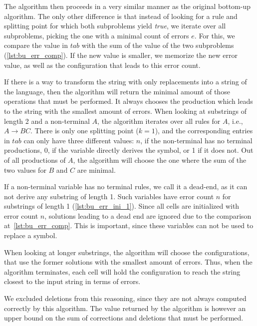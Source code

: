 The algorithm then proceeds in a very similar manner as the original bottom-up algorithm.
The only other difference is that instead of looking for a rule and splitting point for which both subproblems yield \textit{true}, we iterate over all subproblems, picking the one with a minimal count of errors $e$.
For this, we compare the value in $tab$ with the sum of the value of the two subproblems (\cref{lst:bu_err_comp}).
If the new value is smaller, we memorize the new error value, as well as the configuration that leads to this error count.

If there is a way to transform the string with only replacements into a string of the language, then the algorithm will return the minimal amount of those operations that must be performed.
It always chooses the production which leads to the string with the smallest amount of errors.
When looking at substrings of length 2 and a non-terminal $A$, the algorithm iterates over all rules for $A$, i.e., $A\rightarrow BC$.
There is only one splitting point ($k=1$), and the corresponding entries in $tab$ can only have three different values: $n$, if the non-terminal has no terminal productions, 0, if the variable directly derives the symbol, or 1 if it does not.
Out of all productions of $A$, the algorithm will choose the one where the sum of the two values for $B$ and $C$ are minimal.

If a non-terminal variable has no terminal rules, we call it a dead-end, as it can not derive any substring of length 1.
Such variables have error count $n$ for substrings of length 1 (\cref{lst:bu_err_ini_1}).
Since all cells are initialized with error count $n$, solutions leading to a dead end are ignored due to the comparison at~\cref{lst:bu_err_comp}.
This is important, since these variables can not be used to replace a symbol.

When looking at longer substrings, the algorithm will choose the configurations, that use the former solutions with the smallest amount of errors.
Thus, when the algorithm terminates, each cell will hold the configuration to reach the string closest to the input string in terms of errors.

We excluded deletions from this reasoning, since they are not always computed correctly by this algorithm.
The value returned by the algorithm is however an upper bound on the sum of corrections and deletions that must be performed.

